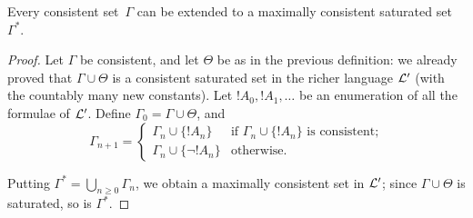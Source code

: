 \documentclass[open-logic-section]{subfiles}
\begin{document}

\begin{lem}
Every consistent set~$\Gamma$ can be extended to a maximally
consistent saturated set~$\Gamma^*$.
\end{lem}

\begin{proof}
Let $\Gamma$ be consistent, and let $\Theta$ be as in the previous
definition: we already proved that $\Gamma \cup \Theta$ is a
consistent saturated set in the richer language $\mathcal L'$ (with the
countably many new constants). Let $!A_0, !A_1, \dots$ be an
enumeration of all the formulae of $\mathcal L'$. Define $\Gamma_0 =
\Gamma \cup \Theta$, and
\[
\Gamma_{n+1} =
\begin{cases}
\Gamma_n \cup \{ !A_n \} & \textrm{if $\Gamma_n \cup \{!A_n\}$ is
  consistent;} \\ 
\Gamma_n \cup \{ \lnot !A_n \} & \textrm{otherwise.}
\end{cases}
\]

Putting $\Gamma^* = \bigcup_{n \geq 0} \Gamma_n$, we obtain a maximally consistent 
set in $\mathcal L'$; since $\Gamma \cup \Theta$ is saturated, so is $\Gamma^*$. 

\end{proof}
\end{document}
